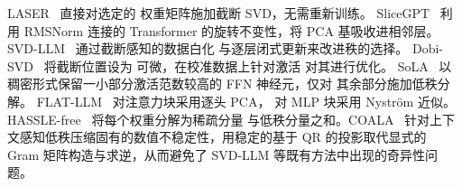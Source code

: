 \documentclass[11pt]{article}
\begin{document}
\begin{mainpart}
LASER~\citep{LASER_2024} 直接对选定的
权重矩阵施加截断 SVD，无需重新训练。
SliceGPT~\citep{slicegpt2024} 利用 RMSNorm 连接的
Transformer 的旋转不变性，将 PCA 基吸收进相邻层。
SVD-LLM~\citep{svdllm2025} 通过截断感知的数据白化
与逐层闭式更新来改进秩的选择。
Dobi-SVD~\citep{wang2025dobisvd} 将截断位置设为
可微，在校准数据上针对激活
对其进行优化。
SoLA~\citep{huang2025sola} 以稠密形式保留一小部分激活范数较高的
FFN 神经元，仅对
其余部分施加低秩分解。
FLAT-LLM~\citep{tian2025flatllm} 对注意力块采用逐头 PCA，
对 MLP 块采用 Nystr\"{o}m 近似。
HASSLE-free~\citep{hasslefree2025} 将每个权重分解为稀疏分量
与低秩分量之和。COALA~\cite{parkina2026coala} 针对上下文感知低秩压缩固有的数值不稳定性，用稳定的基于 QR 的投影取代显式的 Gram 矩阵构造与求逆，从而避免了 SVD-LLM 等既有方法中出现的奇异性问题。


\end{mainpart}
\end{document}
